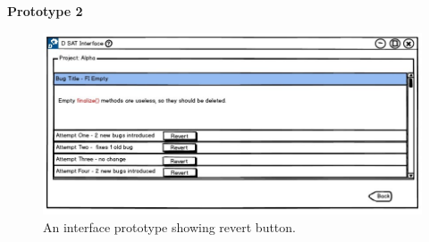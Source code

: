 \textbf{Prototype 2}
\begin{figure}[hbt!]
	\centering
	\includegraphics[width=\linewidth]{figures/d_revert}
	\caption{An interface prototype showing revert button.}
	\label{fig:d_revert}
\end{figure}

\let\cleardoublepage\clearpage